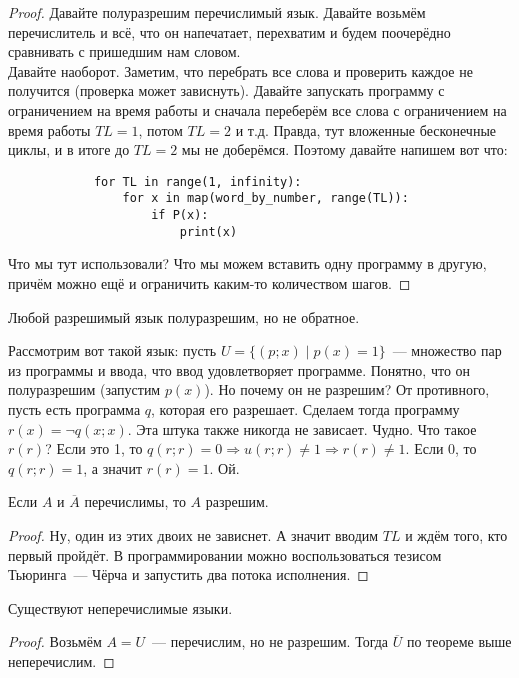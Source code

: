 \documentclass{article}
\begin{document}
    \begin{proof}
        Давайте полуразрешим перечислимый язык. Давайте возьмём перечислитель и всё, что он напечатает, перехватим и будем поочерёдно сравнивать с пришедшим нам словом.\\
        Давайте наоборот. Заметим, что перебрать все слова и проверить каждое не получится (проверка может зависнуть). Давайте запускать программу с ограничением на время работы и сначала переберём все слова с ограничением на время работы $TL=1$, потом $TL=2$ и т.д. Правда, тут вложенные бесконечные циклы, и в итоге до $TL=2$ мы не доберёмся. Поэтому давайте напишем вот что:
        \begin{verbatim}
            for TL in range(1, infinity):
                for x in map(word_by_number, range(TL)):
                    if P(x):
                        print(x)
        \end{verbatim}
        Что мы тут использовали? Что мы можем вставить одну программу в другую, причём можно ещё и ограничить каким-то количеством шагов.
    \end{proof}
    \begin{theorem}
       Любой разрешимый язык полуразрешим, но не обратное.
    \end{theorem}
    \begin{example}
        Рассмотрим вот такой язык: пусть $U=\{(p;x)\mid p(x)=1\}$~--- множество пар из программы и ввода, что ввод удовлетворяет программе. Понятно, что он полуразрешим (запустим $p(x)$). Но почему он не разрешим? От противного, пусть есть программа $q$, которая его разрешает. Сделаем тогда программу $r(x)=\neg q(x;x)$. Эта штука также никогда не зависает. Чудно. Что такое $r(r)$? Если это 1, то $q(r;r)=0\Rightarrow u(r;r)\neq1\Rightarrow r(r)\neq1$. Если 0, то $q(r;r)=1$, а значит $r(r)=1$. Ой.
    \end{example}
    \begin{theorem}
        Если $A$ и $\overline A$ перечислимы, то $A$ разрешим.
    \end{theorem}
    \begin{proof}
        Ну, один из этих двоих не зависнет. А значит вводим $TL$ и ждём того, кто первый пройдёт. В программировании можно воспользоваться тезисом Тьюринга~--- Чёрча и запустить два потока исполнения.
    \end{proof}
    \begin{claim}
        Существуют неперечислимые языки.
    \end{claim}
    \begin{proof}
        Возьмём $A=U$~--- перечислим, но не разрешим. Тогда $\overline U$ по теореме выше неперечислим.
    \end{proof}
\end{document}
